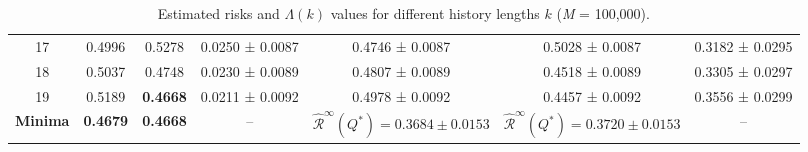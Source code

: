 \documentclass{article}
\begin{document}
\begin{table}[H]
{\begin{tabular}{c c c c c c c}
17 & 0.4996 & 0.5278 & 0.0250 ± 0.0087 & 0.4746 ± 0.0087 & 0.5028 ± 0.0087 & 0.3182 ± 0.0295 \\
18 & 0.5037 & 0.4748 & 0.0230 ± 0.0089 & 0.4807 ± 0.0089 & 0.4518 ± 0.0089 & 0.3305 ± 0.0297 \\
19 & 0.5189 & \textbf{0.4668} & 0.0211 ± 0.0092 & 0.4978 ± 0.0092 & 0.4457 ± 0.0092 & 0.3556 ± 0.0299 \\
\midrule
\multicolumn{1}{r}{\textbf{Minima}} &
\textbf{0.4679} &
\textbf{0.4668} &
-- &
$\hat{\mathcal{R}}^\infty(Q^*) = 0.3684 \pm 0.0153$ &
$\hat{\mathcal{R}}^\infty(Q^*) = 0.3720 \pm 0.0153$ &
-- \\
\bottomrule
\end{tabular}
}
\caption{Estimated risks and $\Lambda(k)$ values for different history lengths $k$ (\textit{M} = 100{,}000).}
\label{tab:universal_learning_2}
\end{table}
\end{document}
